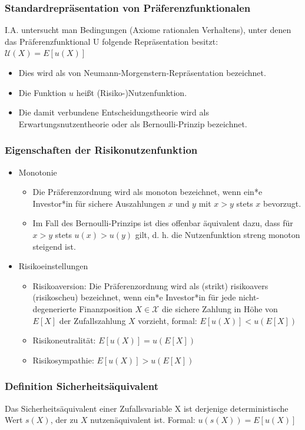 \documentclass[12pt]{report}
\theoremstyle{dotless}
\theoremstyle{definition}
\begin{document}
\subsubsection{Standardrepräsentation von Präferenzfunktionalen}
I.A. untersucht man Bedingungen (Axiome rationalen Verhaltens),
unter denen das Präferenzfunktional U folgende Repräsentation besitzt: $\mathcal{U}(X) = E[u(X)]$

\begin{itemize}
\item Dies wird als von Neumann-Morgenstern-Repräsentation bezeichnet.
\item Die Funktion $u$ heißt (Risiko-)Nutzenfunktion.
\item Die damit verbundene Entscheidungstheorie wird als Erwartungsnutzentheorie
oder als Bernoulli-Prinzip bezeichnet.
\end{itemize}

\subsubsection{Eigenschaften der Risikonutzenfunktion}

\begin{itemize}
\item Monotonie
\begin{itemize}
\item Die Präferenzordnung wird als monoton bezeichnet, wenn ein*e Investor*in für
sichere Auszahlungen $x$ und $y$ mit $x > y$ stets $x$ bevorzugt.
\item Im Fall des Bernoulli-Prinzips ist dies offenbar äquivalent dazu, dass für $x > y$
stets $u(x) > u(y)$ gilt, d. h. die Nutzenfunktion streng monoton steigend ist.
\end{itemize}
\item Risikoeinstellungen
\begin{itemize}
\item Risikoaversion: Die Präferenzordnung wird als (strikt) risikoavers (risikoscheu) bezeichnet, wenn ein*e Investor*in für jede nicht-degenerierte Finanzposition $X \in \mathcal{X}$ die sichere Zahlung in Höhe von $E[X]$
der Zufallszahlung $X$ vorzieht, formal: $E[u(X)]<u(E[X])$
\item Risikoneutralität: $E[u(X)] = u(E[X])$
\item Risikosympathie: $E[u(X)] > u(E[X])$
\end{itemize}
\end{itemize}

\subsubsection{Definition Sicherheitsäquivalent}
Das Sicherheitsäquivalent einer Zufallsvariable X ist derjenige deterministische
Wert $s(X)$, der zu $X$ nutzenäquivalent ist. Formal: $ u(s(X)) = E[u(X)]$
\end{document}
